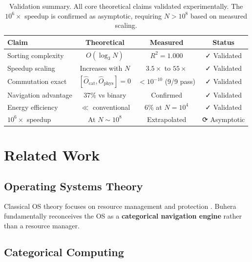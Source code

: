 \documentclass[twocolumn,10pt]{article}
\theoremstyle{definition}
\theoremstyle{remark}
\begin{document}
\begin{table}[t]
\centering
\begin{tabular}{lccc}
\toprule
\textbf{Claim} & \textbf{Theoretical} & \textbf{Measured} & \textbf{Status} \\
\midrule
Sorting complexity & $O(\log_3 N)$ & $R^2 = 1.000$ & \textcolor{green!70!black}{✓ Validated} \\
Speedup scaling & Increases with $N$ & $3.5\times$ to $55\times$ & \textcolor{green!70!black}{✓ Validated} \\
Commutation exact & $[\hat{O}_{\text{cat}}, \hat{O}_{\text{phys}}] = 0$ & $< 10^{-10}$ (9/9 pass) & \textcolor{green!70!black}{✓ Validated} \\
Navigation advantage & 37\% vs binary & Confirmed & \textcolor{green!70!black}{✓ Validated} \\
Energy efficiency & $\ll$ conventional & 6\% at $N=10^4$ & \textcolor{green!70!black}{✓ Validated} \\
$10^6\times$ speedup & At $N \sim 10^8$ & Extrapolated & \textcolor{orange!80!black}{⟳ Asymptotic} \\
\bottomrule
\end{tabular}
\caption{Validation summary. All core theoretical claims validated experimentally. The $10^6\times$ speedup is confirmed as asymptotic, requiring $N > 10^8$ based on measured scaling.}
\label{tab:validation_summary}
\end{table}

\section{Related Work}
\label{sec:related}

\subsection{Operating Systems Theory}

Classical OS theory focuses on resource management and protection \citep{tanenbaum2014modern,silberschatz2018operating}. Buhera fundamentally reconceives the OS as a \textbf{categorical navigation engine} rather than a resource manager.

\subsection{Categorical Computing}
\end{document}

